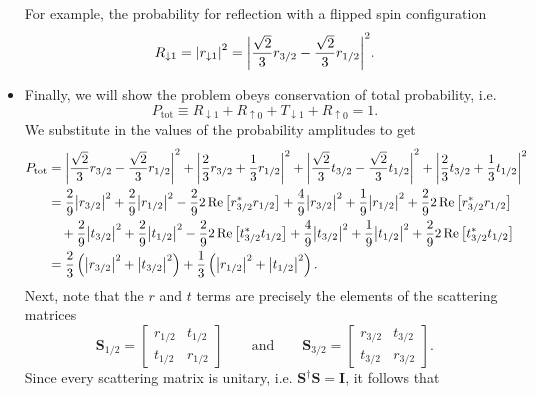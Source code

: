\documentclass[11pt, a4paper]{article}
\newcommand{\eqtext}[1]{\qquad \text{#1} \qquad}
\newcommand{\mat}[1]{\mathbf{#1}} %
\newcommand{\ua}{\uparrow}  %
\newcommand{\da}{\downarrow}  %
\begin{document}
\begin{itemize}
	For example, the probability for reflection with a flipped spin configuration
	\begin{equation*}
		R_{\da 1 } = \abs{r_{\da 1}}^{2} = \abs{\frac{\sqrt{2}}{3}r_{3/2} - \frac{\sqrt{2}}{3}r_{1/2} }^{2}.
	\end{equation*}
	
	\item Finally, we will show the problem obeys conservation of total probability, i.e.
	\begin{equation*}
		P_{\text{tot}} \equiv R_{\da 1} + R_{\ua 0} + T_{\da 1} + R_{\ua 0} = 1.
	\end{equation*}
	We substitute in the values of the probability amplitudes to get
	\begin{align*}
		P_{\text{tot}} &= \abs{\frac{\sqrt{2}}{3}r_{3/2} - \frac{\sqrt{2}}{3}r_{1/2} }^{2} + \abs{\frac{2}{3}r_{3/2} + \frac{1}{3}r_{1/2}}^{2} + \abs{\frac{\sqrt{2}}{3}t_{3/2} - \frac{\sqrt{2}}{3}t_{1/2} }^{2} + \abs{\frac{2}{3}t_{3/2} + \frac{1}{3}t_{1/2}}^{2}\\
		& = \frac{2}{9}\abs{r_{3/2}}^{2} + \frac{2}{9}\abs{r_{1/2}}^{2}  - \frac{2}{9} 2 \Re \big[r^{*}_{3/2}r_{1/2}\big] + \frac{4}{9}\abs{r_{3/2}}^{2} + \frac{1}{9}\abs{r_{1/2}}^{2} + \frac{2}{9} 2 \Re \big[r^{*}_{3/2}r_{1/2}\big]  \\ 
		& {}\quad + \frac{2}{9}\abs{t_{3/2}}^{2} + \frac{2}{9}\abs{t_{1/2}}^{2}  - \frac{2}{9} 2 \Re \big[t^{*}_{3/2}t_{1/2}\big] + \frac{4}{9}\abs{t_{3/2}}^{2} + \frac{1}{9}\abs{t_{1/2}}^{2} + \frac{2}{9} 2 \Re \big[t^{*}_{3/2}t_{1/2}\big] \\
		& = \frac{2}{3}\left(\abs{r_{3/2}}^{2} + \abs{t_{3/2}}^{2}\right) + \frac{1}{3}\left(\abs{r_{1/2}}^{2} + \abs{t_{1/2}}^{2}\right).
	\end{align*}
	Next, note that the $ r $ and $ t $ terms are precisely the elements of the scattering matrices
	\begin{equation*}
		\mat{S}_{1/2} = 
		\begin{bmatrix}
			r_{1/2} & t_{1/2}\\
			t_{1/2} & r_{1/2}
		\end{bmatrix}
		\eqtext{and}
		\mat{S}_{3/2} = 
			\begin{bmatrix}
				r_{3/2} & t_{3/2}\\
				t_{3/2} & r_{3/2}
			\end{bmatrix}.
	\end{equation*}
	Since every scattering matrix is unitary, i.e. $ \mat{S}^{\dagger}\mat{S} = \mat{I} $, it follows that 
	\begin{equation*}

\end{equation*}
\end{itemize}
\end{document}
